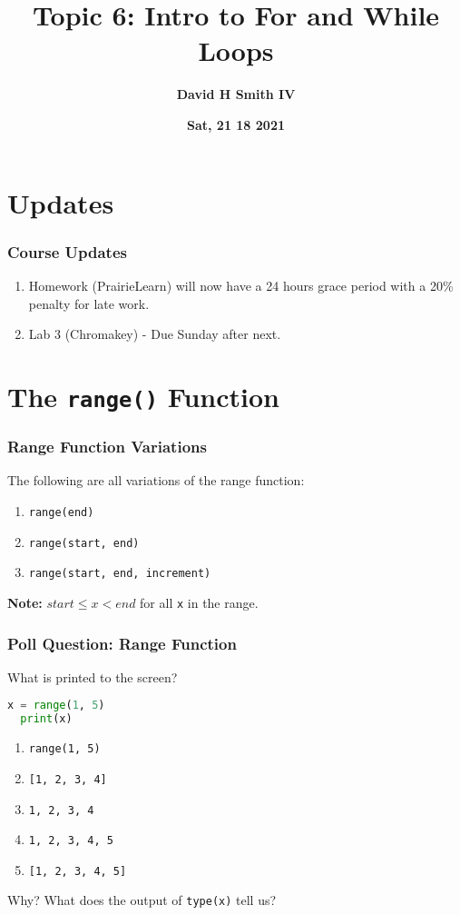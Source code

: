 \documentclass{beamer}
\title{\textbf{Topic 6: Intro to For and While Loops}}
\author{\textbf{David H Smith IV}}
\institute[\textbf{UIUC}]{\textbf{University of Illinois Urbana-Champaign}}
\date{\textbf{Sat, 21 18 2021}}
\begin{document}
\frame{\titlepage}

\section{Updates}

%
%
\begin{frame}[fragile]
  \frametitle{Course Updates}
  \begin{enumerate}[A]
    \item Homework (PrairieLearn) will now have a 24 hours grace period with a 20\% penalty for late work.
    \item Lab 3 (Chromakey) - Due Sunday after next.
  \end{enumerate}
\end{frame}




\section{The \lstinline|range()| Function}

%
%
\begin{frame}[fragile]
  \frametitle{Range Function Variations}
  The following are all variations of the range function:
  \begin{enumerate}[A]
    \item \lstinline|range(end)|
    \item \lstinline|range(start, end)|
    \item \lstinline|range(start, end, increment)|
  \end{enumerate}
  \vfill
  \textbf{Note: } $start \leq x < end$ for all \lstinline|x| in the range.
\end{frame}

%
%
\begin{frame}[fragile]
  \frametitle{Poll Question: Range Function}
  What is printed to the screen?
  \begin{lstlisting}[language=Python, autogobble]
  x = range(1, 5)
  print(x)
  \end{lstlisting}
  \vfill
  \begin{enumerate}[A]
    \item \lstinline|range(1, 5)|
    \item \lstinline|[1, 2, 3, 4]|
    \item \lstinline|1, 2, 3, 4|
    \item \lstinline|1, 2, 3, 4, 5|
    \item \lstinline|[1, 2, 3, 4, 5]|
  \end{enumerate}
  \vfill \pause
  Why? What does the output of \lstinline|type(x)| tell us?
\end{frame}
\end{document}
